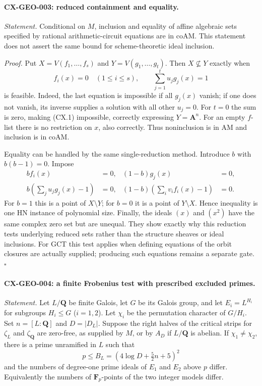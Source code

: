 \paragraph{CX-GEO-003: reduced containment and equality.}
\emph{Statement.} Conditional on $M$, inclusion and equality of affine
algebraic sets specified by rational arithmetic-circuit equations are in
$\mathrm{coAM}$. This statement does not assert the same bound for
scheme-theoretic ideal inclusion.

\emph{Proof.} Put $X=V(f_1,\ldots,f_s)$ and
$Y=V(g_1,\ldots,g_t)$. Then $X\nsubseteq Y$ exactly when
\[
        f_i(x)=0\quad(1\leq i\leq s),\qquad
        \sum_{j=1}^t u_jg_j(x)=1                              \tag{CX.1}
\]
is feasible. Indeed, the last equation is impossible if all $g_j(x)$ vanish;
if one does not vanish, its inverse supplies a solution with all other
$u_j=0$. For $t=0$ the sum is zero, making (CX.1) impossible, correctly
expressing $Y=\mathbf A^n$. For an empty $f$-list there is no restriction
on $x$, also correctly. Thus noninclusion is in $\mathrm{AM}$ and
inclusion is in $\mathrm{coAM}$.

Equality can be handled by the same single-reduction method. Introduce
$b$ with $b(b-1)=0$. Impose
\[
\begin{aligned}
 b f_i(x)&=0,& (1-b)g_j(x)&=0,\\
 b\left(\sum_j u_jg_j(x)-1\right)&=0,&
 (1-b)\left(\sum_i v_if_i(x)-1\right)&=0.
\end{aligned}
\]
For $b=1$ this is a point of $X\setminus Y$; for $b=0$ it is a point
of $Y\setminus X$. Hence inequality is one HN instance of polynomial size.
Finally, the ideals $(x)$ and $(x^2)$ have the same complex zero set but
are unequal. They show exactly why this reduction tests underlying reduced
sets rather than the structure sheaves or ideal inclusions.
For GCT this test applies when defining equations of the orbit closures
are actually supplied; producing such equations remains a separate gate.
\hfill$\square$

\paragraph{CX-GEO-004: a finite Frobenius test with prescribed excluded primes.}
\emph{Statement.} Let $L/\mathbf Q$ be finite Galois, let $G$ be its Galois
group, and let $E_i=L^{H_i}$ for subgroups $H_i\leq G$ ($i=1,2$).
Let $\chi_i$ be the permutation character of $G/H_i$. Set $n=[L:\mathbf Q]$
and $D=|D_L|$. Suppose the right halves of the critical strips for
$\zeta_L$ and $\zeta_{\mathbf Q}$ are zero-free, as supplied by $M$, or by
$A_D$ if $L/\mathbf Q$ is abelian. If $\chi_1\ne\chi_2$, there is a prime
unramified in $L$ such that
\[
       p\leq B_L=(4\log D+\tfrac52 n+5)^2                  \tag{CX.2}
\]
and the numbers of degree-one prime ideals of $E_1$ and $E_2$ above $p$
differ. Equivalently the numbers of $\mathbf F_p$-points of the two integer
models differ.

